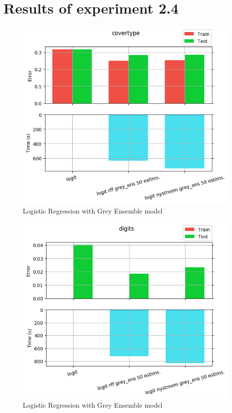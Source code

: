 
\chapter{Results of experiment 2.4} %

\label{Appendix2-4} %

\begin{figure}[th]
\centering
\includegraphics[scale=\imgscale]{Figures/2_4/covertype}
\decoRule
\caption[2.4 covertype]{Logistic Regression with Grey Ensemble model}
\label{fig:2_4_covertype}
\end{figure}

\begin{figure}[th]
\centering
\includegraphics[scale=\imgscale]{Figures/2_4/digits}
\decoRule
\caption[2.4 digits]{Logistic Regression with Grey Ensemble model}
\label{fig:2_4_digits}
\end{figure}

